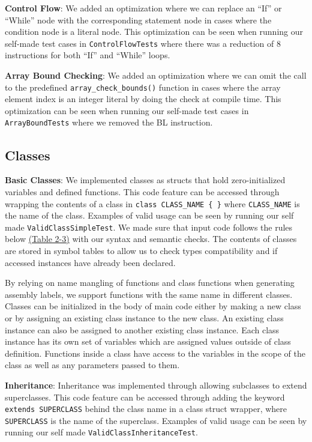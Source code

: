 \documentclass[11pt,a4paper]{article}
\newcommand{\cmd}[1]{\texttt{#1}}
\begin{document}
\noindent \textbf{Control Flow}: We added an optimization where we can replace an “If” or “While” node with the corresponding statement node in cases where the condition node is a literal node. This optimization can be seen when running our self-made test cases in \cmd{ControlFlowTests} where there was a reduction of 8 instructions for both “If” and “While” loops.
\newline

\noindent \textbf{Array Bound Checking}: We added an optimization where we can omit the call to the predefined \cmd{array\_check\_bounds()} function in cases where the array element index is an integer literal by doing the check at compile time. This optimization can be seen when running our self-made test cases in \cmd{ArrayBoundTests} where we removed the BL instruction.

\subsection{Classes}
\noindent \textbf{Basic Classes}: We implemented classes as structs that hold zero-initialized variables and defined functions. This code feature can be accessed through wrapping the contents of a class in \cmd{class CLASS\_NAME \{ \}} where \cmd{CLASS\_NAME} is the name of the class. Examples of valid usage can be seen by running our self made \cmd{ValidClassSimpleTest}. We made sure that input code follows the rules below \hyperref[sec:table23]{(Table 2-3)} with our syntax and semantic checks. The contents of classes are stored in symbol tables to allow us to check types compatibility and if accessed instances have already been declared.

By relying on name mangling of functions and class functions when generating assembly labels, we support functions with the same name in different classes. Classes can be initialized in the body of main code either by making a new class or by assigning an existing class instance to the new class. An existing class instance can also be assigned to another existing class instance. Each class instance has its own set of variables which are assigned values outside of class definition. Functions inside a class have access to the variables in the scope of the class as well as any parameters passed to them. 
\newline

\noindent \textbf{Inheritance}: Inheritance was implemented through allowing subclasses to extend superclasses. This code feature can be accessed through adding the keyword \cmd{extends SUPERCLASS} behind the class name in a class struct wrapper, where \cmd{SUPERCLASS} is the name of the superclass. Examples of valid usage can be seen by running our self made \cmd{ValidClassInheritanceTest}.
\end{document}
